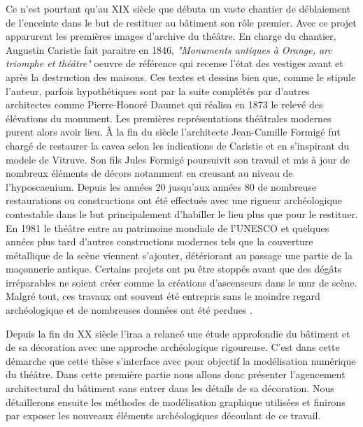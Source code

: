 			 Ce n'est pourtant qu'au XIX siècle que débuta un vaste chantier de déblaiement de l'enceinte dans le but de restituer au bâtiment son rôle premier. Avec ce projet apparurent les premières images d'archive du théâtre. En charge du chantier, Augustin Caristie fait paraitre en 1846, \textit{"Monuments antiques à Orange, arc triomphe et théâtre"} oeuvre de référence qui recense l'état des vestiges avant et après la destruction des maisons. Ces textes et dessins bien que, comme le stipule l'auteur, parfois hypothétiques sont par la suite complétés par d'autres architectes comme Pierre-Honoré Daumet qui réalisa en 1873 le relevé des élévations du monument. Les premières représentations théâtrales modernes purent alors avoir lieu. \`{A} la fin du siècle l'architecte Jean-Camille Formigé fut chargé de restaurer la \gls{cavea} selon les indications de Caristie et en s'inspirant du modele de Vitruve. Son fils Jules Formigé poursuivit son travail et mis à jour de nombreux éléments de décors notamment en creusant au niveau de l'\gls{hyposcaenium}. Depuis les années 20 jusqu'aux années 80 de nombreuse restaurations ou constructions ont été effectués avec une rigueur archéologique contestable dans le but principalement d'habiller le lieu plus que pour le restituer. En 1981 le théâtre entre au patrimoine mondiale de l'UNESCO et quelques années plus tard d'autres constructions modernes tels que la couverture métallique de la scène viennent s'ajouter, détériorant au passage une partie de la maçonnerie antique. Certains projets ont pu être stoppés avant que des dégâts irréparables ne soient créer comme la créations d'ascenseurs dans le mur de scène. Malgré tout, ces travaux ont souvent été entrepris sans le moindre regard archéologique et de nombreuses données ont été perdues \citep{carteArcheo}.
			 
			 Depuis la fin du XX siècle l'\gls{iraa} a relancé une étude approfondie du bâtiment et de sa décoration avec une approche archéologique rigoureuse. C'est dans cette démarche que cette thèse s'interface avec pour objectif la modélisation numérique du théâtre. Dans cette première partie nous allons donc présenter l'agencement architectural du bâtiment sans entrer dans les détails de sa décoration. Nous détaillerons ensuite les méthodes de modélisation graphique utilisées et finirons par exposer les nouveaux éléments archéologiques découlant de ce travail.
			 
